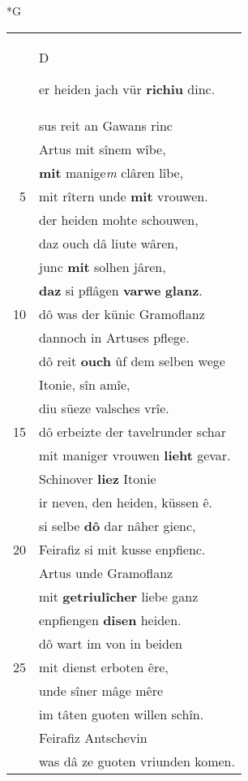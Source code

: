 \documentclass[8pt,a4paper,notitlepage]{article}
\begin{document}
\begin{table}[ht]
\begin{minipage}[t]{0.5\linewidth}
\small
\begin{center}*G
\end{center}
\begin{tabular}{rl}
 & \begin{large}D\end{large}er heiden jach vür \textbf{richiu} dinc.\\ 
 & sus reit an Gawans rinc\\ 
 & Artus mit sînem wîbe,\\ 
 & \textbf{mit} manige\textit{m} clâren lîbe,\\ 
5 & mit rîtern unde \textbf{mit} vrouwen.\\ 
 & der heiden mohte schouwen,\\ 
 & daz ouch dâ liute wâren,\\ 
 & junc \textbf{mit} solhen jâren,\\ 
 & \textbf{daz} si pflâgen \textbf{varwe} \textbf{glanz}.\\ 
10 & dô was der künic Gramoflanz\\ 
 & dannoch in Artuses pflege.\\ 
 & dô reit \textbf{ouch} ûf dem selben wege\\ 
 & Itonie, sîn amîe,\\ 
 & diu süeze valsches vrîe.\\ 
15 & dô erbeizte der tavelrunder schar\\ 
 & mit maniger vrouwen \textbf{lieht} gevar.\\ 
 & Schinover \textbf{liez} Itonie\\ 
 & ir neven, den heiden, küssen ê.\\ 
 & si selbe \textbf{dô} dar nâher gienc,\\ 
20 & Feirafiz si mit kusse enpfienc.\\ 
 & Artus unde Gramoflanz\\ 
 & mit \textbf{getriulîcher} liebe ganz\\ 
 & enpfiengen \textbf{disen} heiden.\\ 
 & dô wart im von in beiden\\ 
25 & mit dienst erboten êre,\\ 
 & unde sîner mâge mêre\\ 
 & im tâten guoten willen schîn.\\ 
 & Feirafiz Antschevin\\ 
 & was dâ ze guoten vriunden komen.\\ 

\end{tabular}
\end{minipage}
\end{table}
\end{document}
